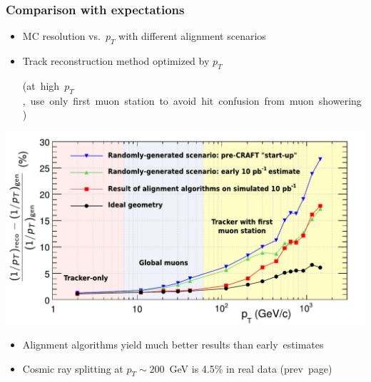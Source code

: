 \documentclass[compress]{beamer}
\begin{document}
\begin{frame}
\frametitle{Comparison with expectations}

\begin{itemize}
\item MC resolution vs.~$p_T$ with different alignment scenarios
\item Track reconstruction method optimized by $p_T$

\mbox{\scriptsize (at high $p_T$, use only first muon station to avoid hit confusion from muon showering)\hspace{-1 cm}}
\end{itemize}

\vspace{-0.15 cm}
\begin{center}
\includegraphics[width=0.9\linewidth]{curvature_resolution.pdf}
\end{center}

\vspace{-0.35 cm}
\begin{itemize}
\item Alignment algorithms yield much better results than \mbox{early estimates\hspace{-1 cm}}
\item Cosmic ray splitting at $p_T \sim 200$~GeV is 4.5\% in real data \mbox{(prev page)\hspace{-1 cm}}
\end{itemize}
\end{frame}

\end{document}
